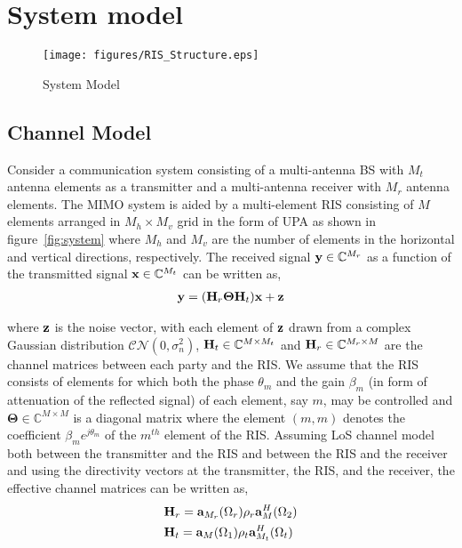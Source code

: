 \section{System model} 
\label{sec:desc}
\begin{figure}
    \centering
    \texttt{[image: figures/RIS\_Structure.eps]}
    \caption{System Model}
    \label{fig:RIS}
\end{figure}


\subsection{Channel Model}
Consider a communication system consisting of a multi-antenna BS with $M_t$ antenna elements as a transmitter and a multi-antenna receiver with $M_r$ antenna elements. The MIMO system is aided by a multi-element RIS consisting of $M$ elements arranged in $M_h \times M_v$ grid in the form of UPA  as shown in figure~\ref{fig:system} where $M_h$ and $M_v$ are the number of elements in the horizontal and vertical directions, respectively. The received signal ${\bf{y}} \in \mathbb{C}^{M_r}$ as a function of the transmitted signal ${\bf{x}} \in \mathbb{C}^{M_t}$ can be written as,
\begin{align}
    {\bf{y}} = ({\bf{H}}_r\boldsymbol\Theta{\bf{H}}_t){\bf{x}} + {\bf{z}} \label{channel}
\end{align}

\noindent where ${\bf{z}}$ is the noise vector, with each element of ${\bf{z}}$ drawn from a complex Gaussian distribution $\mathcal{C N}\left(0, \sigma_n^{2}\right)$, ${\bf{H}}_t \in \mathbb{C}^{M\times M_t}$ and ${\bf{H}}_r \in \mathbb{C}^{M_r\times M}$ are the channel matrices between each party and the RIS. We assume that the RIS consists of elements for which both the phase $\theta_m$ and the gain $\beta_m$ (in form of attenuation of the reflected signal) of each element, say $m$, may be controlled and $\boldsymbol\Theta \in \mathbb{C}^{M\times M}$ is a diagonal matrix where the element $(m,m)$ denotes the coefficient $\beta_m e^{j \theta_m}$ of the $m^{th}$ element of the RIS. Assuming LoS channel model both between the transmitter and the RIS and between the RIS and the receiver and using the directivity vectors at the transmitter, the RIS, and the receiver, the effective channel matrices can be written as,
\begin{align}
    & {\bf{H}}_r = {\bf{a}}_{M_r}(\Omega_r)\rho_{r}{\bf{a}}^{H}_{M}(\Omega_{2})\label{channel_r} \\
    & {\bf{H}}_t = {\bf{a}}_{M}(\Omega_{1})\rho_{t}{\bf{a}}^{H}_{M_t}(\Omega_{t}) \label{channel_t}
\end{align}

